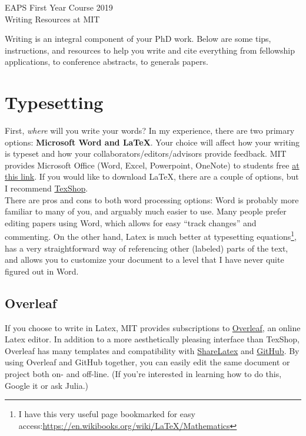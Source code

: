\documentclass{article}
\begin{document}
\begin{center}
{\LARGE EAPS First Year Course 2019}\\
\vspace{10pt}
{\Large Writing Resources at MIT}\\
\vspace{6pt}
\end{center}
Writing is an integral component of your PhD work. Below are some tips, instructions, and resources to help you write and cite everything from fellowship applications, to conference abstracts, to generals papers.

\section*{Typesetting}
First, \emph{where} will you write your words? In my experience, there are two primary options:
\textbf{Microsoft Word and \LaTeX}.
Your choice will affect how your writing is typeset and how your collaborators/editors/advisors provide feedback. MIT provides Microsoft Office (Word, Excel, Powerpoint, OneNote) to students free \href{https://ist.mit.edu/office/license}{at this link}. If you would like to download \LaTeX, there are a couple of options, but I recommend \href{https://pages.uoregon.edu/koch/texshop/}{TexShop}.\\

There are pros and cons to both word processing options: Word is probably more familiar to many of you, and arguably much easier to use. Many people prefer editing papers using Word, which allows for easy ``track changes'' and commenting. On the other hand, Latex is much better at typesetting equations\footnote{I have this very useful page bookmarked for easy access:\href{ https://en.wikibooks.org/wiki/LaTeX/Mathematics}{https://en.wikibooks.org/wiki/LaTeX/Mathematics}}, has a very straightforward way of referencing other (labeled) parts of the text, and allows you to customize your document to a level that I have never quite figured out in Word. 

\subsection*{Overleaf}
If you choose to write in Latex, MIT provides subscriptions to \href{https://www.overleaf.com}{Overleaf}, an online Latex editor. In addition to a more aesthetically pleasing interface than TexShop, Overleaf has many templates and compatibility with \href{https://www.sharelatex.com}{ShareLatex} and
\href{https://github.com}{GitHub}. By using Overleaf and GitHub together, you can easily edit the same document or project both on- and off-line. (If you're interested in learning how to do this, Google it or ask Julia.)
\end{document}
